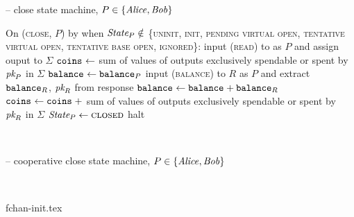 \begin{center}
\begin{systembox}{\fchan{} -- close state machine, $P \in \{\mathit{Alice},
  \mathit{Bob}\}$}
\begin{algorithmic}[1]
      \State On (\textsc{close}, $P$) by \adversary when $\itistate_P \notin$
      \{\textsc{uninit}, \textsc{init}, \textsc{pending virtual open},
      \textsc{tentative virtual open}, \textsc{tentative base open},
      \textsc{ignored}\}:
      \label{code:functionality:close:check}
      \Indent
        \State input (\textsc{read}) to \ledger as $P$ and assign ouput to
        $\Sigma$
        \State $\texttt{coins}_{} \gets$ sum of values of outputs exclusively spendable
        or spent by $\textit{pk}_{P}$
        in $\Sigma$
        \label{code:functionality:close:coins}
        \State $\texttt{balance}_{} \gets \texttt{balance}_{P}$
          \State input (\textsc{balance}) to $R$ as $P$ and extract
          $\texttt{balance}_{R}$, $\textit{pk}_{R}$ from response
          \State $\texttt{balance}_{} \gets \texttt{balance}_{} + \texttt{balance}_{R}$
          \State $\texttt{coins}_{} \gets \texttt{coins}_{} \:+ $ sum of values of outputs
          exclusively spendable or spent by $\textit{pk}_{R}$ in $\Sigma$
        \EndFor
        \If{$\coins{} \geq \subbalance{}$}
        \label{code:functionality:close:check:if}
          \State $\itistate_P \gets \textsc{closed}$
        \Else \: 
          \State halt
          \label{code:functionality:close:halt}
        \EndIf
      \EndIndent
    \end{algorithmic}
  \end{systembox}
  \label{code:functionality:close}
\end{center} \ \\

\begin{center}
  \begin{systembox}{\fchan{} -- cooperative close state machine, $P \in
  \{\mathit{Alice}, \mathit{Bob}\}$}
    \begin{algorithmic}[1]
      \State {}
    \end{algorithmic}
  \end{systembox}
  \label{code:functionality:coop-close}
\end{center} \ \\

\begin{figure*}
  {fchan-init.tex}
  \caption{\fchan state machine up to \textsc{init} (both parties)}
  \label{figure:fchan-state-init}
\end{figure*}

